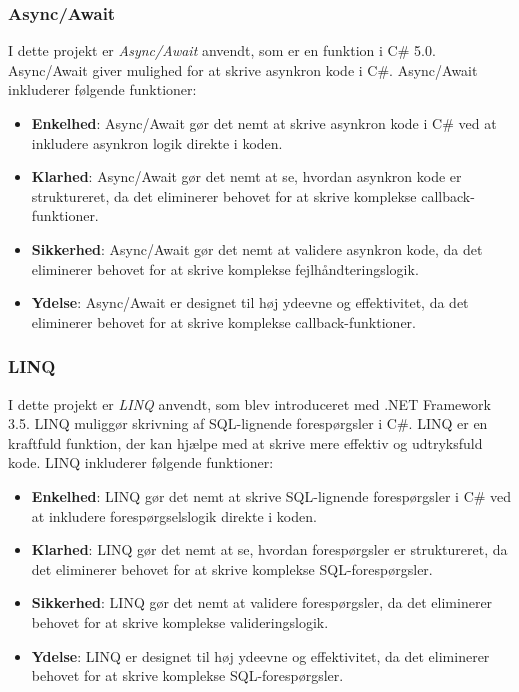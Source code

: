 \subsubsection{Async/Await}
I dette projekt er \emph{Async/Await} anvendt, som er en funktion i C\# 5.0. Async/Await giver mulighed for at skrive asynkron kode i C\#. Async/Await inkluderer følgende funktioner:
\begin{itemize}
\item \textbf{Enkelhed}: Async/Await gør det nemt at skrive asynkron kode i C\# ved at inkludere asynkron logik direkte i koden.
\item \textbf{Klarhed}: Async/Await gør det nemt at se, hvordan asynkron kode er struktureret, da det eliminerer behovet for at skrive komplekse callback-funktioner.
\item \textbf{Sikkerhed}: Async/Await gør det nemt at validere asynkron kode, da det eliminerer behovet for at skrive komplekse fejlhåndteringslogik.
\item \textbf{Ydelse}: Async/Await er designet til høj ydeevne og effektivitet, da det eliminerer behovet for at skrive komplekse callback-funktioner.
\end{itemize}

\subsubsection{LINQ}
I dette projekt er \emph{LINQ} anvendt, som blev introduceret med .NET Framework 3.5. LINQ muliggør skrivning af SQL-lignende forespørgsler i C\#. LINQ er en kraftfuld funktion, der kan hjælpe med at skrive mere effektiv og udtryksfuld kode. LINQ inkluderer følgende funktioner:
\begin{itemize}
\item \textbf{Enkelhed}: LINQ gør det nemt at skrive SQL-lignende forespørgsler i C\# ved at inkludere forespørgselslogik direkte i koden.
\item \textbf{Klarhed}: LINQ gør det nemt at se, hvordan forespørgsler er struktureret, da det eliminerer behovet for at skrive komplekse SQL-forespørgsler.
\item \textbf{Sikkerhed}: LINQ gør det nemt at validere forespørgsler, da det eliminerer behovet for at skrive komplekse valideringslogik.
\item \textbf{Ydelse}: LINQ er designet til høj ydeevne og effektivitet, da det eliminerer behovet for at skrive komplekse SQL-forespørgsler.
\end{itemize}


